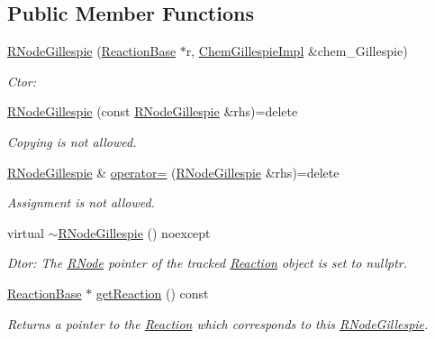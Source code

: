 \subsection*{Public Member Functions}
\begin{DoxyCompactItemize}
\item 
\hyperlink{classRNodeGillespie_a8540bdaeda2d7c9eba6fc923f1486cd0}{R\+Node\+Gillespie} (\hyperlink{classReactionBase}{Reaction\+Base} $\ast$r, \hyperlink{classChemGillespieImpl}{Chem\+Gillespie\+Impl} \&chem\+\_\+\+Gillespie)
\begin{DoxyCompactList}\small\item\em Ctor\+: \end{DoxyCompactList}\item 
\hyperlink{classRNodeGillespie_a0d94ffb06cf018d8e5c677093196e92b}{R\+Node\+Gillespie} (const \hyperlink{classRNodeGillespie}{R\+Node\+Gillespie} \&rhs)=delete
\begin{DoxyCompactList}\small\item\em Copying is not allowed. \end{DoxyCompactList}\item 
\hyperlink{classRNodeGillespie}{R\+Node\+Gillespie} \& \hyperlink{classRNodeGillespie_a13c0e95cc74ec4facf7f9cc91a2baa18}{operator=} (\hyperlink{classRNodeGillespie}{R\+Node\+Gillespie} \&rhs)=delete
\begin{DoxyCompactList}\small\item\em Assignment is not allowed. \end{DoxyCompactList}\item 
virtual \hyperlink{classRNodeGillespie_a8875cb9389ef23e37ae306073a3aad4d}{$\sim$\+R\+Node\+Gillespie} () noexcept
\begin{DoxyCompactList}\small\item\em Dtor\+: The \hyperlink{classRNode}{R\+Node} pointer of the tracked \hyperlink{classReaction}{Reaction} object is set to nullptr. \end{DoxyCompactList}\item 
\hyperlink{classReactionBase}{Reaction\+Base} $\ast$ \hyperlink{classRNodeGillespie_aadf2dad38b64b7f8adbe5dc1d1fb1488}{get\+Reaction} () const 
\begin{DoxyCompactList}\small\item\em Returns a pointer to the \hyperlink{classReaction}{Reaction} which corresponds to this \hyperlink{classRNodeGillespie}{R\+Node\+Gillespie}. \end{DoxyCompactList}\item 

\end{DoxyCompactItemize}
